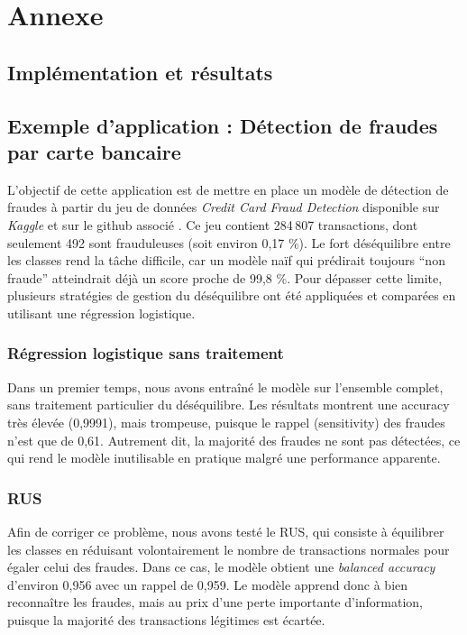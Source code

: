 \documentclass{article}
\begin{document}
\newpage

\section{Annexe}

\subsection{Implémentation et résultats}
\subsection*{Exemple d'application : Détection de fraudes par carte bancaire}

L’objectif de cette application est de mettre en place un modèle de détection de fraudes à partir du jeu de données \textit{Credit Card Fraud Detection} disponible sur \textit{Kaggle} et sur le github associé \cite{gh}.
Ce jeu contient 284\,807 transactions, dont seulement 492 sont frauduleuses (soit environ 0,17 \%).
Le fort déséquilibre entre les classes rend la tâche difficile, car un modèle naïf qui prédirait toujours ``non fraude'' atteindrait déjà un score proche de 99,8 \%.
Pour dépasser cette limite, plusieurs stratégies de gestion du déséquilibre ont été appliquées et comparées en utilisant une régression logistique.

\subsubsection*{Régression logistique sans traitement}
Dans un premier temps, nous avons entraîné le modèle sur l’ensemble complet, sans traitement particulier du déséquilibre.
Les résultats montrent une accuracy très élevée (0,9991), mais trompeuse, puisque le rappel (sensitivity) des fraudes n’est que de 0,61.
Autrement dit, la majorité des fraudes ne sont pas détectées, ce qui rend le modèle inutilisable en pratique malgré une performance apparente.

\subsubsection*{RUS}
Afin de corriger ce problème, nous avons testé le RUS, qui consiste à équilibrer les classes en réduisant volontairement le nombre de transactions normales pour égaler celui des fraudes.
Dans ce cas, le modèle obtient une \textit{balanced accuracy} d’environ 0,956 avec un rappel de 0,959.
Le modèle apprend donc à bien reconnaître les fraudes, mais au prix d’une perte importante d’information, puisque la majorité des transactions légitimes est écartée.
\end{document}
